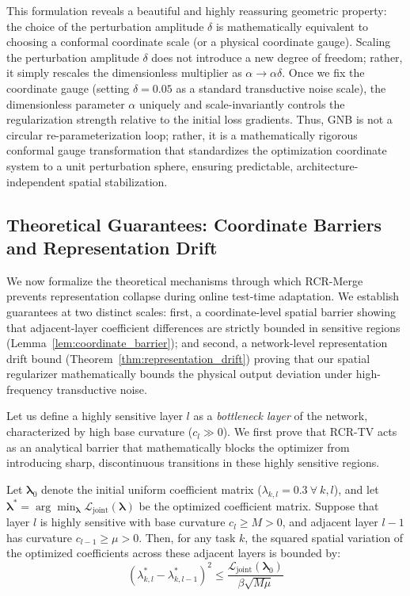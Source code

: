 This formulation reveals a beautiful and highly reassuring geometric property: the choice of the perturbation amplitude $\delta$ is mathematically equivalent to choosing a conformal coordinate scale (or a physical coordinate gauge). Scaling the perturbation amplitude $\delta$ does not introduce a new degree of freedom; rather, it simply rescales the dimensionless multiplier as $\alpha \to \alpha \delta$. Once we fix the coordinate gauge (setting $\delta = 0.05$ as a standard transductive noise scale), the dimensionless parameter $\alpha$ uniquely and scale-invariantly controls the regularization strength relative to the initial loss gradients. Thus, GNB is not a circular re-parameterization loop; rather, it is a mathematically rigorous conformal gauge transformation that standardizes the optimization coordinate system to a unit perturbation sphere, ensuring predictable, architecture-independent spatial stabilization.

\subsection{Theoretical Guarantees: Coordinate Barriers and Representation Drift}

We now formalize the theoretical mechanisms through which RCR-Merge prevents representation collapse during online test-time adaptation. We establish guarantees at two distinct scales: first, a coordinate-level spatial barrier showing that adjacent-layer coefficient differences are strictly bounded in sensitive regions (Lemma~\ref{lem:coordinate_barrier}); and second, a network-level representation drift bound (Theorem~\ref{thm:representation_drift}) proving that our spatial regularizer mathematically bounds the physical output deviation under high-frequency transductive noise.

Let us define a highly sensitive layer $l$ as a \emph{bottleneck layer} of the network, characterized by high base curvature ($c_l \gg 0$). We first prove that RCR-TV acts as an analytical barrier that mathematically blocks the optimizer from introducing sharp, discontinuous transitions in these highly sensitive regions.

\begin{lemma}
\label{lem:coordinate_barrier}
Let $\boldsymbol{\lambda}_0$ denote the initial uniform coefficient matrix ($\lambda_{k, l} = 0.3 \ \forall \ k, l$), and let $\boldsymbol{\lambda}^* = \arg\min_{\boldsymbol{\lambda}} \mathcal{L}_{\text{joint}}(\boldsymbol{\lambda})$ be the optimized coefficient matrix. Suppose that layer $l$ is highly sensitive with base curvature $c_l \ge M > 0$, and adjacent layer $l-1$ has curvature $c_{l-1} \ge \mu > 0$. Then, for any task $k$, the squared spatial variation of the optimized coefficients across these adjacent layers is bounded by:
\begin{equation}
\label{eq:barrier_bound}
(\lambda^*_{k, l} - \lambda^*_{k, l-1})^2 \le \frac{\mathcal{L}_{\text{joint}}(\boldsymbol{\lambda}_0)}{\beta \sqrt{M \mu}}
\end{equation}
\end{lemma}

